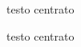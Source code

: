 \documentclass[a4paper,10pt]{article}
\begin{document}
\lipsum[1]

\begin{center}
testo centrato
\end{center}

\lipsum[1]

\centering
testo centrato

\lipsum[1]
\end{document}
